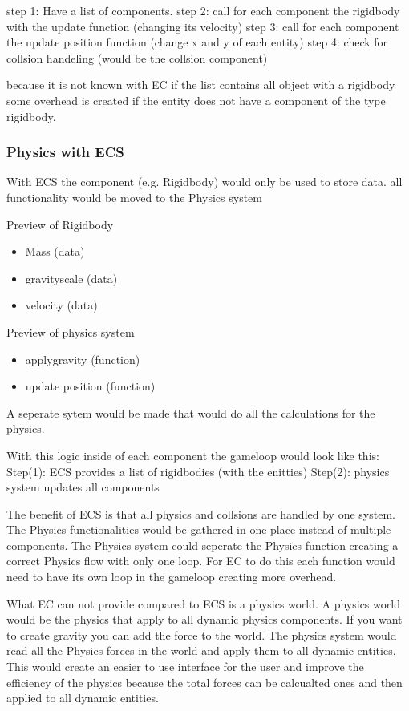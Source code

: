 \documentclass{projdoc}
\begin{document}
step 1: Have a list of components.
step 2: call for each component the rigidbody with the update function (changing its velocity)
step 3: call for each component the update position function (change x and y of each entity)
step 4: check for collsion handeling (would be the collsion component)

because it is not known with EC if the list contains all object with a rigidbody some overhead is created if the entity does not have a component of the type rigidbody.

\subsubsection{Physics with ECS}
With ECS the component (e.g. Rigidbody) would only be used to store data. all functionality would be moved to the Physics system

Preview of Rigidbody
\begin{itemize}
	\item Mass (data)
	\item gravityscale (data)
	\item velocity (data)
\end{itemize}

Preview of physics system
\begin{itemize}
	\item applygravity (function)
	\item update position (function)
\end{itemize}

A seperate sytem would be made that would do all the calculations for the physics.

With this logic inside of each component the gameloop would look like this:
Step(1): ECS provides a list of rigidbodies (with the enitties)
Step(2): physics system updates all components

The benefit of ECS is that all physics and collsions are handled by one system. The Physics functionalities would be gathered in one place instead of multiple components. The Physics system could seperate the Physics function creating a correct Physics flow with only one loop. For EC to do this each function would need to have its own loop in the gameloop creating more overhead.

What EC can not provide compared to ECS is a physics world. A physics world would be the physics that apply to all dynamic physics components. If you want to create gravity you can add the force to the world. The physics system would read all the Physics forces in the world and apply them to all dynamic entities. This would create an easier to use interface for the user and improve the efficiency of the physics because the total forces can be calcualted ones and then applied to all dynamic entities.
\end{document}
